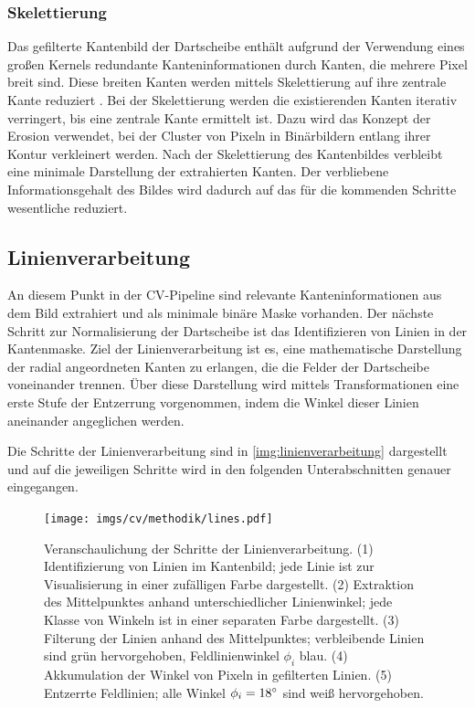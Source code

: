 \subsubsection{Skelettierung}
\label{sec:skelettierung}

Das gefilterte Kantenbild der Dartscheibe enthält aufgrund der Verwendung eines großen Kernels redundante Kanteninformationen durch Kanten, die mehrere Pixel breit sind. Diese breiten Kanten werden mittels Skelettierung auf ihre zentrale Kante reduziert \cite{skeletonization}. Bei der Skelettierung werden die existierenden Kanten iterativ verringert, bis eine zentrale Kante ermittelt ist. Dazu wird das Konzept der Erosion verwendet, bei der Cluster von Pixeln in Binärbildern entlang ihrer Kontur verkleinert werden. Nach der Skelettierung des Kantenbildes verbleibt eine minimale Darstellung der extrahierten Kanten. Der verbliebene Informationsgehalt des Bildes wird dadurch auf das für die kommenden Schritte wesentliche reduziert.


\subsection{Linienverarbeitung}
\label{sec:linien}

An diesem Punkt in der CV-Pipeline sind relevante Kanteninformationen aus dem Bild extrahiert und als minimale binäre Maske vorhanden. Der nächste Schritt zur Normalisierung der Dartscheibe ist das Identifizieren von Linien in der Kantenmaske. Ziel der Linienverarbeitung ist es, eine mathematische Darstellung der radial angeordneten Kanten zu erlangen, die die Felder der Dartscheibe voneinander trennen. Über diese Darstellung wird mittels Transformationen eine erste Stufe der Entzerrung vorgenommen, indem die Winkel dieser Linien aneinander angeglichen werden.

Die Schritte der Linienverarbeitung sind in \autoref{img:linienverarbeitung} dargestellt und auf die jeweiligen Schritte wird in den folgenden Unterabschnitten genauer eingegangen.

\begin{figure}
    \centering
    \texttt{[image: imgs/cv/methodik/lines.pdf]}
    \caption{Veranschaulichung der Schritte der Linienverarbeitung. (1) Identifizierung von Linien im Kantenbild; jede Linie ist zur Visualisierung in einer zufälligen Farbe dargestellt. (2) Extraktion des Mittelpunktes anhand unterschiedlicher Linienwinkel; jede Klasse von Winkeln ist in einer separaten Farbe dargestellt. (3) Filterung der Linien anhand des Mittelpunktes; verbleibende Linien sind grün hervorgehoben, Feldlinienwinkel $\phi_i$ blau. (4) Akkumulation der Winkel von Pixeln in gefilterten Linien. (5) Entzerrte Feldlinien; alle Winkel $\phi_i=18^{\circ}$ sind weiß hervorgehoben.}
    \label{img:linienverarbeitung}
\end{figure}

